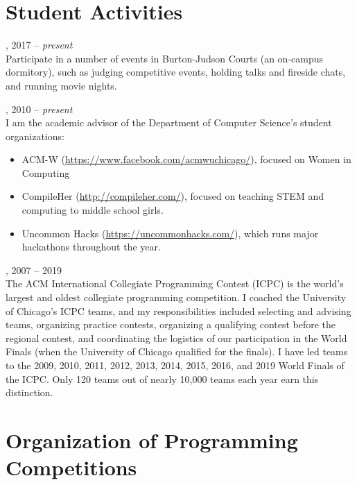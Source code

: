 \documentclass{resume}
\begin{document}
\section*{\hspace{-1cm}Student Activities}

\begin{category}{}
, 2017 -- \emph{present}\\
Participate in a number of events in Burton-Judson Courts (an on-campus dormitory), such as judging competitive events, holding talks and fireside chats, and running movie nights.

, 2010 -- \emph{present}\\
I am the academic advisor of the Department of Computer Science's student organizations:
\begin{itemize}
\item ACM-W (\url{https://www.facebook.com/acmwuchicago/}), focused on Women in Computing
\item CompileHer (\url{http://compileher.com/}), focused on teaching STEM and computing to middle school girls.
\item Uncommon Hacks (\url{https://uncommonhacks.com/}), which runs major hackathons throughout the year.
\end{itemize}
, 2007 -- 2019\\
The ACM International Collegiate Programming Contest (ICPC) is the world's largest and oldest collegiate programming competition. I coached the University of Chicago's ICPC teams, and my responsibilities included selecting and advising teams, organizing practice contests, organizing a qualifying contest before the regional contest, and coordinating the logistics of our participation in the World Finals (when the University of Chicago qualified for the finals). I have led teams to the 2009, 2010, 2011, 2012, 2013, 2014, 2015, 2016, and 2019 World Finals of the ICPC. Only 120 teams out of nearly 10,000 teams each year earn this distinction.
\end{category}


\section*{\hspace{-1cm}Organization of Programming Competitions}
\end{document}
